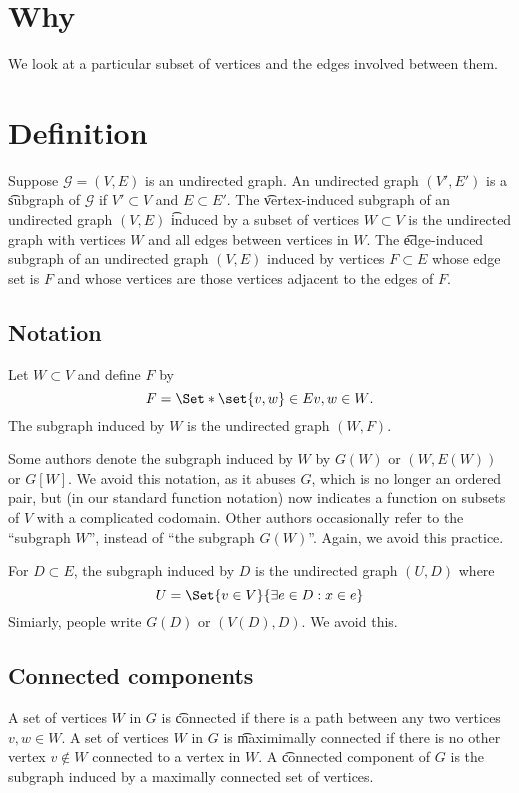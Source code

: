 
\section*{Why}

We look at a particular subset of vertices and the edges involved between them.

\section*{Definition}

Suppose $\mathcal{G}  = (V, E)$ is an undirected graph.
An undirected graph $(V', E')$ is a \t{subgraph} of $\mathcal{G} $ if $V' \subset V$ and $E \subset E'$.
The \t{vertex-induced subgraph} of an undirected graph $(V, E)$ \t{induced by} a subset of vertices $W \subset V$ is the undirected graph with vertices $W$ and all edges between vertices in $W$.
The \t{edge-induced subgraph} of an undirected graph $(V, E)$ induced by vertices $F \subset E$ whose edge set is $F$ and whose vertices are those vertices adjacent to the edges of $F$.

\subsection*{Notation}

Let $W \subset V$ and define $F$ by
\[
F = \Set*{\set{v, w} \in E}{v, w \in W}.
\]
The subgraph induced by $W$ is the undirected graph $(W, F)$.

Some authors denote the subgraph induced by $W$ by $G(W)$ or $(W, E(W))$ or $G[W]$.
We avoid this notation, as it abuses $G$, which is no longer an ordered pair, but (in our standard function notation) now indicates a function on subsets of $V$ with a complicated codomain.
Other authors occasionally refer to the ``subgraph $W$'', instead of ``the subgraph $G(W)$''.
Again, we avoid this practice.

For $D \subset E$, the subgraph induced by $D$ is the undirected graph $(U, D)$ where
\[
U = \Set{v \in V}{\exists e \in D: x \in e}
\]
Simiarly, people write $G(D)$ or $(V(D), D)$.
We avoid this.

\subsection*{Connected components}

A set of vertices $W$ in $G$ is \t{connected} if there is a path between any two vertices $v, w \in W$.
A set of vertices $W$ in $G$ is \t{maximimally connected} if there is no other vertex $v \not \in W$ connected to a vertex in $W$.
A \t{connected component} of $G$ is the subgraph induced by a maximally connected set of vertices.

